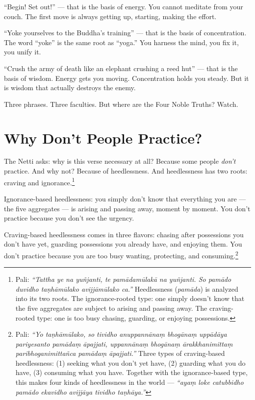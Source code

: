 ``Begin! Set out!'' --- that is the basis of energy. You cannot meditate from your couch. The first move is always getting up, starting, making the effort.

``Yoke yourselves to the Buddha's training'' --- that is the basis of concentration. The word ``yoke'' is the same root as ``yoga.'' You harness the mind, you fix it, you unify it.

``Crush the army of death like an elephant crushing a reed hut'' --- that is the basis of wisdom. Energy gets you moving. Concentration holds you steady. But it is wisdom that actually destroys the enemy.

Three phrases. Three faculties. But where are the Four Noble Truths? Watch.

\section*{Why Don't People Practice?}

The Netti asks: why is this verse necessary at all? Because some people \textit{don't} practice. And why not? Because of heedlessness. And heedlessness has two roots: craving and ignorance.\footnote{Pali: \textit{``Tattha ye na yuñjanti, te pamādamūlakā na yuñjanti. So pamādo duvidho taṇhāmūlako avijjāmūlako ca.''} Heedlessness (\textit{pamāda}) is analyzed into its two roots. The ignorance-rooted type: one simply doesn't know that the five aggregates are subject to arising and passing away. The craving-rooted type: one is too busy chasing, guarding, or enjoying possessions.}

Ignorance-based heedlessness: you simply don't know that everything you are --- the five aggregates --- is arising and passing away, moment by moment. You don't practice because you don't see the urgency.

Craving-based heedlessness comes in three flavors: chasing after possessions you don't have yet, guarding possessions you already have, and enjoying them. You don't practice because you are too busy wanting, protecting, and consuming.\footnote{Pali: \textit{``Yo taṇhāmūlako, so tividho anuppannānaṃ bhogānaṃ uppādāya pariyesanto pamādaṃ āpajjati, uppannānaṃ bhogānaṃ ārakkhanimittaṃ paribhoganimittañca pamādaṃ āpajjati.''} Three types of craving-based heedlessness: (1) seeking what you don't yet have, (2) guarding what you do have, (3) consuming what you have. Together with the ignorance-based type, this makes four kinds of heedlessness in the world --- \textit{``ayaṃ loke catubbidho pamādo ekavidho avijjāya tividho taṇhāya.''}}

